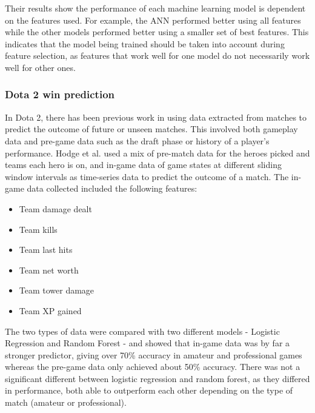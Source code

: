 \documentclass[Report.tex]{subfiles}
\begin{document}
Their results show the performance of each machine learning model is dependent on the features used. For example, the ANN performed better using all features while the other models performed better using a smaller set of best features. This indicates that the model being trained should be taken into account during feature selection, as features that work well for one model do not necessarily work well for other ones. 

\subsubsection{Dota 2 win prediction}
In Dota 2, there has been previous work in using data extracted from matches to predict the outcome of future or unseen matches. This involved both gameplay data and pre-game data such as the draft phase or history of a player's performance. Hodge et al. \cite{dota-mixed-rank-win} used a mix of pre-match data for the heroes picked and teams each hero is on, and in-game data of game states at different sliding window intervals as time-series data to predict the outcome of a match. The in-game data collected included the following features:
\begin{itemize}
\item Team damage dealt
\item Team kills
\item Team last hits
\item Team net worth
\item Team tower damage
\item Team XP gained
\end{itemize}
The two types of data were compared with two different models - Logistic Regression and Random Forest - and showed that in-game data was by far a stronger predictor, giving over 70\% accuracy in amateur and professional games whereas the pre-game data only achieved about 50\% accuracy. There was not a significant different between logistic regression and random forest, as they differed in performance, both able to outperform each other depending on the type of match (amateur or professional). 
\end{document}
